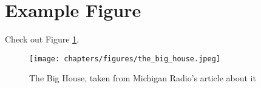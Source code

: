 \blindtext


\section{Example Figure}
\label{sec:examplesec3}

Check out Figure \ref{fig:the_big_house}. \blindtext

\begin{figure}
    \centering
    \texttt{[image: chapters/figures/the\_big\_house.jpeg]}
    \caption{The Big House, taken from Michigan Radio's article about it \cite{the_big_house}}
    \label{fig:the_big_house}
\end{figure}

\blindtext[3]